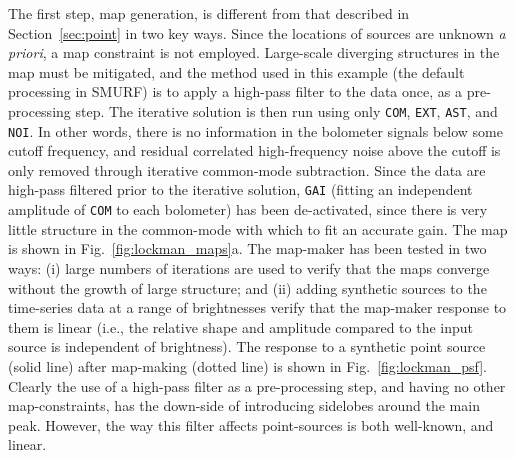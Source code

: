 \documentclass[useAMS,usenatbib,nofootinbib]{mn2e}
\newcommand{\model}[1]{\texttt{#1}}
\begin{document}
The first step, map generation, is different from that described in
Section~\ref{sec:point} in two key ways. Since the locations of
sources are unknown \emph{a priori}, a map constraint is not
employed. Large-scale diverging structures in the map must be
mitigated, and the method used in this example (the default processing
in SMURF) is to apply a high-pass filter to the data once, as a
pre-processing step. The iterative solution is then run using only
\model{COM}, \model{EXT}, \model{AST}, and \model{NOI}. In other
words, there is no information in the bolometer signals below some
cutoff frequency, and residual correlated high-frequency noise above
the cutoff is only removed through iterative common-mode
subtraction. Since the data are high-pass filtered prior to the
iterative solution, \model{GAI} (fitting an independent amplitude of
\model{COM} to each bolometer) has been de-activated, since there is
very little structure in the common-mode with which to fit an accurate
gain. The map is shown in Fig.~\ref{fig:lockman_maps}a. The map-maker
has been tested in two ways: (i) large numbers of iterations are used
to verify that the maps converge without the growth of large
structure; and (ii) adding synthetic sources to the time-series data
at a range of brightnesses verify that the map-maker response to them
is linear (i.e., the relative shape and amplitude compared to the
input source is independent of brightness). The response to a
synthetic point source (solid line) after map-making (dotted line) is
shown in Fig.~\ref{fig:lockman_psf}. Clearly the use of a high-pass
filter as a pre-processing step, and having no other map-constraints,
has the down-side of introducing sidelobes around the main
peak. However, the way this filter affects point-sources is both
well-known, and linear.
\end{document}
